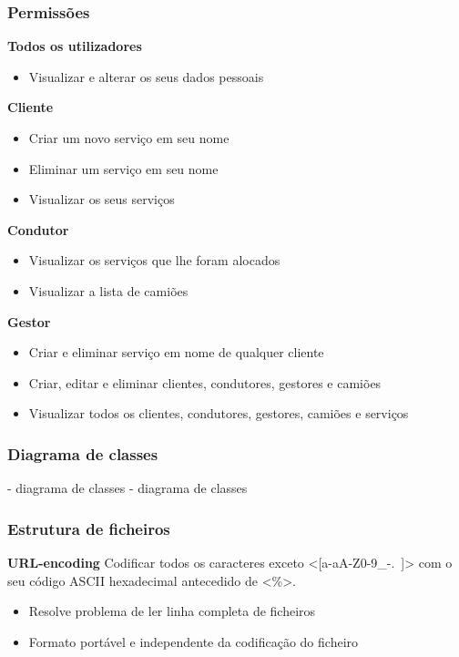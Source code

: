 \documentclass{beamer}
\def\\{}
\def\texttt#1{<#1>}
\begin{document}
\begin{frame}
\frametitle{Permissões}
\textbf{Todos os utilizadores}
\begin{itemize}
	\item Visualizar e alterar os seus dados pessoais
\end{itemize}

\textbf{Cliente}
\begin{itemize}
	\item Criar um novo serviço em seu nome
	\item Eliminar um serviço em seu nome
	\item Visualizar os seus serviços
\end{itemize}

\textbf{Condutor}
\begin{itemize}
	\item Visualizar os serviços que lhe foram alocados
	\item Visualizar a lista de camiões
\end{itemize}

\textbf{Gestor}
\begin{itemize}
	\item Criar e eliminar serviço em nome de qualquer cliente
	\item Criar, editar e eliminar clientes, condutores, gestores e camiões
	\item Visualizar todos os clientes, condutores, gestores, camiões e serviços
\end{itemize}
\end{frame}

\begin{frame}
\frametitle{Diagrama de classes}


- diagrama de classes
- diagrama de classes
\end{frame}

\begin{frame}
\frametitle{Estrutura de ficheiros}
\begin{center}
\begin{minipage}{0.35\textwidth}
	\small
\end{minipage}
\begin{minipage}{0.6\textwidth}
\textbf{URL-encoding}\\
Codificar todos os caracteres exceto \texttt{[a-aA-Z0-9\_-.~]} com o seu código ASCII hexadecimal antecedido de \texttt{\%}.
\begin{itemize}
	\item Resolve problema de ler linha completa de ficheiros
	\item Formato portável e independente da codificação do ficheiro
\end{itemize}
\end{minipage}
\end{center}
\end{frame}
\end{document}
